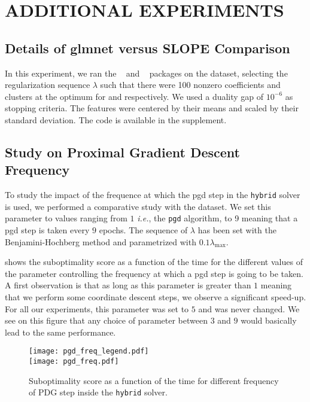 \section{ADDITIONAL EXPERIMENTS}\label{sec:add_expes}

\subsection{Details of \textsf{glmnet} versus \textsf{SLOPE} Comparison}
\label{sec:slope-vs-glmnet}

In this experiment, we ran the ~\parencite{friedman2022} and ~\parencite{larsson2022d} packages on the  dataset, selecting the regularization sequence \(\lambda\) such that there were 100 nonzero coefficients and clusters at the optimum for  and  respectively.
We used a duality gap of \(10^{-6}\) as stopping criteria.
The features were centered by their means and scaled by their standard deviation.
The code is available in the supplement.

\subsection{Study on Proximal Gradient Descent Frequency}
To study the impact of the frequence at which the pgd step in the \texttt{hybrid} solver is used, we performed a comparative study with the  dataset.
We set this parameter to values ranging from $1$ \textit{i.e.}, the \texttt{pgd} algorithm, to 9 meaning that a pgd step is taken every $9$ epochs.
The sequence of $\lambda$ has been set with the Benjamini-Hochberg method and parametrized with $0.1 \lambda_{\text{max}}$.

 shows the suboptimality score as a function of the time for the different values of the parameter controlling the frequency at which a pgd step is going to be taken.
A first observation is that as long as this parameter is greater than $1$ meaning that we perform some coordinate descent steps, we observe a significant speed-up.
For all our experiments, this parameter was set to $5$ and was never changed.
We see on this figure that any choice of parameter between $3$ and $9$ would basically lead to the same performance.

\begin{figure*}[htb]
  \centering
  \texttt{[image: pgd\_freq\_legend.pdf]} \\
  \texttt{[image: pgd\_freq.pdf]}
  \caption{Suboptimality score as a function of the time for different frequency of PDG step inside the \texttt{hybrid} solver.}
  \label{fig:pgd_freq}
\end{figure*}

